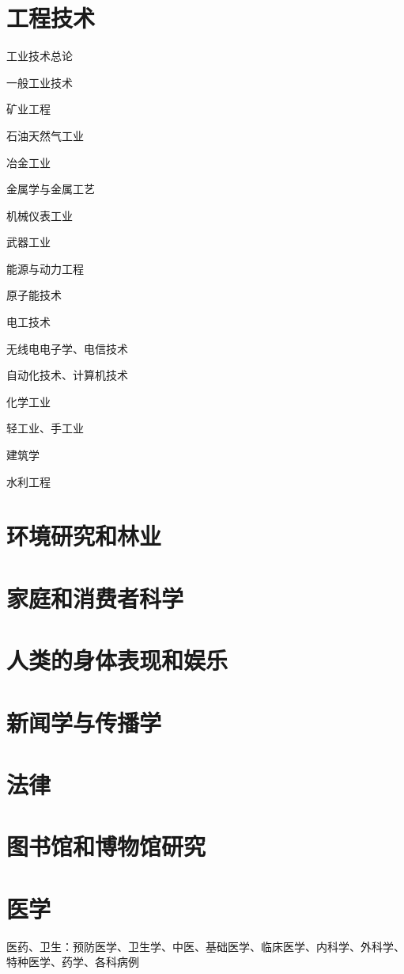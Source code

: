\documentclass[UTF8]{ApplicationUniverse}
\begin{document}
\chapter{工程技术} %
工业技术总论

一般工业技术

矿业工程

石油天然气工业

冶金工业

金属学与金属工艺

机械仪表工业

武器工业

能源与动力工程

原子能技术

电工技术

无线电电子学、电信技术

自动化技术、计算机技术

化学工业

轻工业、手工业

建筑学

水利工程

\chapter{环境研究和林业}

\chapter{家庭和消费者科学}

\chapter{人类的身体表现和娱乐}


\chapter{新闻学与传播学}

\chapter{法律}

\chapter{图书馆和博物馆研究}




\chapter{医学} %
医药、卫生：预防医学、卫生学、中医、基础医学、临床医学、内科学、外科学、特种医学、药学、各科病例
\end{document}
